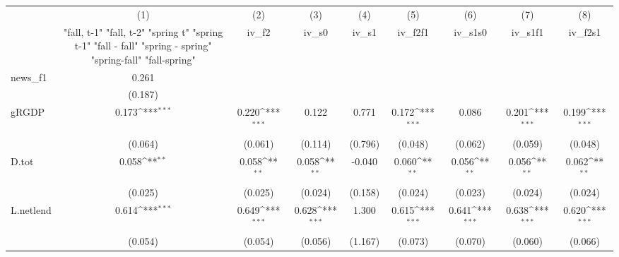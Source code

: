 {
\def\sym#1{\ifmmode^{#1}\else\(^{#1}\)\fi}
\begin{tabular}{l*{8}{c}}
\toprule
            &\multicolumn{1}{c}{(1)}&\multicolumn{1}{c}{(2)}&\multicolumn{1}{c}{(3)}&\multicolumn{1}{c}{(4)}&\multicolumn{1}{c}{(5)}&\multicolumn{1}{c}{(6)}&\multicolumn{1}{c}{(7)}&\multicolumn{1}{c}{(8)}\\
            &\multicolumn{1}{c}{  "fall, t-1" "fall, t-2" "spring t" "spring t-1"  "fall - fall" "spring - spring" "spring-fall" "fall-spring" }&\multicolumn{1}{c}{iv\_f2}&\multicolumn{1}{c}{iv\_s0}&\multicolumn{1}{c}{iv\_s1}&\multicolumn{1}{c}{iv\_f2f1}&\multicolumn{1}{c}{iv\_s1s0}&\multicolumn{1}{c}{iv\_s1f1}&\multicolumn{1}{c}{iv\_f2s1}\\
\midrule
news\_f1     &       0.261         &                     &                     &                     &                     &                     &                     &                     \\
            &     (0.187)         &                     &                     &                     &                     &                     &                     &                     \\
\addlinespace
gRGDP       &       0.173\sym{***}&       0.220\sym{***}&       0.122         &       0.771         &       0.172\sym{***}&       0.086         &       0.201\sym{***}&       0.199\sym{***}\\
            &     (0.064)         &     (0.061)         &     (0.114)         &     (0.796)         &     (0.048)         &     (0.062)         &     (0.059)         &     (0.048)         \\
\addlinespace
D.tot       &       0.058\sym{**} &       0.058\sym{**} &       0.058\sym{**} &      -0.040         &       0.060\sym{**} &       0.056\sym{**} &       0.056\sym{**} &       0.062\sym{**} \\
            &     (0.025)         &     (0.025)         &     (0.024)         &     (0.158)         &     (0.024)         &     (0.023)         &     (0.024)         &     (0.024)         \\
\addlinespace
L.netlend   &       0.614\sym{***}&       0.649\sym{***}&       0.628\sym{***}&       1.300         &       0.615\sym{***}&       0.641\sym{***}&       0.638\sym{***}&       0.620\sym{***}\\
            &     (0.054)         &     (0.054)         &     (0.056)         &     (1.167)         &     (0.073)         &     (0.070)         &     (0.060)         &     (0.066)         \\

\end{tabular}}
